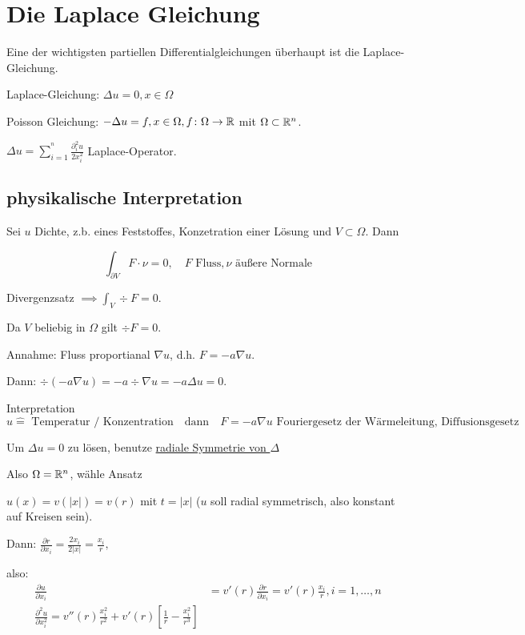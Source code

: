\section{Die Laplace Gleichung}

Eine der wichtigsten partiellen Differentialgleichungen überhaupt ist die Laplace-Gleichung.

Laplace-Gleichung: $\Delta u = 0, x \in \Omega$

Poisson Gleichung: $-\Delta u = f, x \in \Omega, f \colon \Omega \to \mathbb{R}$
mit $\Omega \subset \mathbb{R}^n$.

$ \Delta u = \sum_{i = 1}^^n \frac{\partial_i^2 u}{2 x_i^2}$ Laplace-Operator.

\subsection{physikalische Interpretation}

Sei $u$ Dichte, z.b. eines Feststoffes, Konzetration einer Lösung und $V \subset \Omega$. Dann

$$
\int_{\partial V} F \cdot \nu = 0, \quad F \text{ Fluss}, \nu \text{ äußere Normale}
$$

Divergenzsatz $\implies \int_V \div F = 0$.

Da $V$ beliebig in $\Omega$ gilt $\div F = 0$.

Annahme: Fluss proportianal $\nabla u$, d.h. $F = -a \nabla u$.

Dann: $\div(-a \nabla u) = - a \div \nabla u = - a \Delta u = 0$.

Interpretation
$$
u \hat = \text{ Temperatur / Konzentration} \quad \text{dann} \quad F = - a \nabla u \text{ Fouriergesetz der Wärmeleitung, Diffusionsgesetz}
$$

Um $\Delta u = 0$ zu lösen, benutze \underline{radiale Symmetrie von $\Delta$}

Also $\Omega = \mathbb{R}^n$, wähle Ansatz

$u(x) = v(|x|) = v(r)$ mit $t = |x|$ ($u$ soll radial symmetrisch, also konstant auf Kreisen sein).

Dann: $\frac{\partial r}{\partial x_i} = \frac{2 x_i}{2 |x|} = \frac{x_i}{r},$

also: 
\begin{align*}
  \frac{\partial u}{\partial x_i} &= v'(r) \frac{\partial r}{\partial x_i} = v'(r) \frac{x_i}{r}, i = 1, \dots, n \\
  \frac{\partial^2 u}{\partial x_i^2} = v''(r) \frac{x_i^2}{r^2} + v'(r)[\frac{1}{r} - \frac{x_i^2}{r^3}]
\end{align*}

